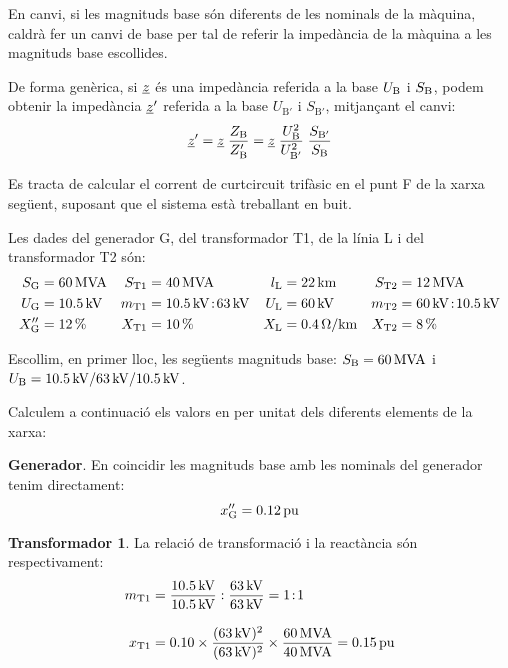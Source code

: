  En canvi, si les magnituds base són diferents de les nominals de la màquina, caldrà fer un canvi de base per tal de referir la impedància de la màquina a les magnituds base escollides.

De forma genèrica, si $\underline{z}$ és una impedància referida a la base $U_\mathrm{B}$ i $S_\mathrm{B}$, podem obtenir la impedància $\underline{z}'$ referida a la base $U_{\text{B}'}$ i $S_{\text{B}'}$, mitjançant el canvi:
\begin{equation}
   \underline{z}' = \underline{z} \; \frac{Z_\mathrm{B}}{Z_\mathrm{B}'} = \underline{z} \; \frac{U_\mathrm{B}^2}{U_{\text{B}'}^2} \; \frac{S_{\text{B}'}}{S_\mathrm{B}}\label{eq_pu_canvi_base}
\end{equation}


\begin{exemple}[\MetodeCalculPU{}]
	\addcontentsxms{\MetodeCalculPU}
    Es tracta de calcular el corrent de curtcircuit trifàsic en el punt F de la xarxa següent, suposant
    que el sistema està treballant en buit.
    \begin{center}
        
    \end{center}

    Les dades del generador G, del transformador T1, de la línia L i del transformador T2 són:
    \begin{align*}
       S_\mathrm{G} &= \qty{60}{MVA} & S_\mathrm{T1} &= \qty{40}{MVA} & l_\mathrm{L} &= \qty{22}{km} & S_\mathrm{T2} &=
       \qty{12}{MVA} \\
       U_\mathrm{G} &= \qty{10,5}{kV} & m_\mathrm{T1} &= \qty{10,5}{kV}\!:\!\qty{63}{kV} & U_\mathrm{L} &= \qty{60}{kV} & m_\mathrm{T2} &= \qty{60}{kV}\!:\!\qty{10,5}{kV} \\
       X''_\mathrm{G} &= \qty{12}{\percent} & X_\mathrm{T1} &= \qty{10}{\percent} & X_\mathrm{L} &= \qty{0,4}{\ohm/km} & X_\mathrm{T2} &= \qty{8}{\percent}
    \end{align*}

    Escollim, en primer lloc, les següents magnituds base: $S_\mathrm{B} = \qty{60}{MVA}$ i $U_\mathrm{B}
    = \qty{10,5}{kV} / \qty{63}{kV} / \qty{10,5}{kV}$.

    Calculem a continuació els valors en per unitat dels diferents elements de la xarxa:

    \textbf{Generador}. En coincidir les magnituds base amb les nominals del generador tenim
     directament:
    \[
    x''_\mathrm{G} = \qty{0,12}{pu}
    \]

    \textbf{Transformador 1}. La relació de transformació i la reactància són respectivament:
    \begin{align*}
    m_\mathrm{T1} &= \frac{\qty{10,5}{kV}}{\qty{10,5}{kV}} :
    \frac{\qty{63}{kV}}{\qty{63}{kV}} = 1\!:\!1 \\[3mm]
    x_\mathrm{T1} &= \num{0,10} \times \frac{(\qty{63}{kV})^2}{(\qty{63}{kV})^2} \times
    \frac{\qty{60}{MVA}}{\qty{40}{MVA}}  = \qty{0,15}{pu}
    \end{align*}


\end{exemple}
